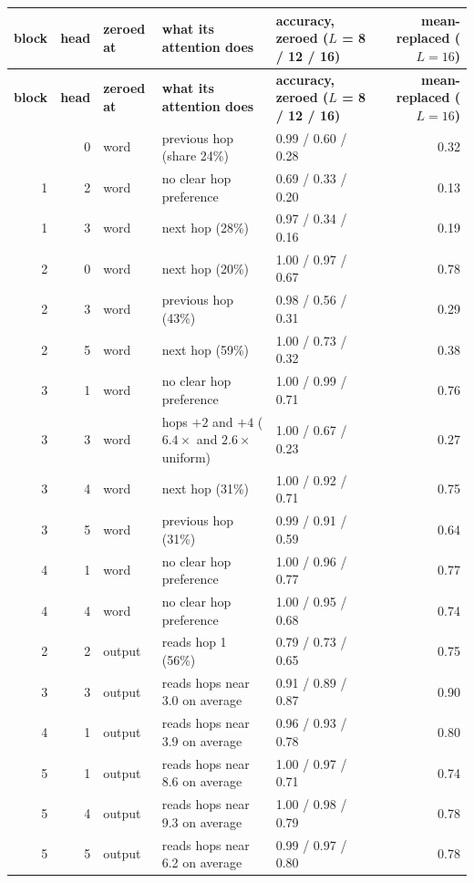 \documentclass[paper=a4,fontsize=11pt,DIV=11,parskip=half,headings=small,numbers=noendperiod]{scrartcl}
\DeclareRobustCommand{\hdr}[1]{\textsf{\bfseries #1}}
\begin{document}
{\footnotesize\nopagebreak[4]
\begin{longtable}{@{}r r l >{\raggedright\arraybackslash}p{4.0cm} l r@{}}
\toprule
\hdr{block} & \hdr{head} & \hdr{zeroed at} & \hdr{what its attention does} & \hdr{accuracy, zeroed ($L$ = 8 / 12 / 16)} & \hdr{mean-replaced ($L=16$)} \\
\midrule
\endfirsthead
\toprule
\hdr{block} & \hdr{head} & \hdr{zeroed at} & \hdr{what its attention does} & \hdr{accuracy, zeroed ($L$ = 8 / 12 / 16)} & \hdr{mean-replaced ($L=16$)} \\
\midrule
\endhead
\bottomrule
\endlastfoot
1 & 0 & word & previous hop (share 24\%) & 0.99 / 0.60 / 0.28 & 0.32 \\
1 & 2 & word & no clear hop preference & 0.69 / 0.33 / 0.20 & 0.13 \\
1 & 3 & word & next hop (28\%) & 0.97 / 0.34 / 0.16 & 0.19 \\
2 & 0 & word & next hop (20\%) & 1.00 / 0.97 / 0.67 & 0.78 \\
2 & 3 & word & previous hop (43\%) & 0.98 / 0.56 / 0.31 & 0.29 \\
2 & 5 & word & next hop (59\%) & 1.00 / 0.73 / 0.32 & 0.38 \\
3 & 1 & word & no clear hop preference & 1.00 / 0.99 / 0.71 & 0.76 \\
3 & 3 & word & hops $+2$ and $+4$ ($6.4\times$ and $2.6\times$ uniform) & 1.00 / 0.67 / 0.23 & 0.27 \\
3 & 4 & word & next hop (31\%) & 1.00 / 0.92 / 0.71 & 0.75 \\
3 & 5 & word & previous hop (31\%) & 0.99 / 0.91 / 0.59 & 0.64 \\
4 & 1 & word & no clear hop preference & 1.00 / 0.96 / 0.77 & 0.77 \\
4 & 4 & word & no clear hop preference & 1.00 / 0.95 / 0.68 & 0.74 \\
2 & 2 & output & reads hop 1 (56\%) & 0.79 / 0.73 / 0.65 & 0.75 \\
3 & 3 & output & reads hops near 3.0 on average & 0.91 / 0.89 / 0.87 & 0.90 \\
4 & 1 & output & reads hops near 3.9 on average & 0.96 / 0.93 / 0.78 & 0.80 \\
5 & 1 & output & reads hops near 8.6 on average & 1.00 / 0.97 / 0.71 & 0.74 \\
5 & 4 & output & reads hops near 9.3 on average & 1.00 / 0.98 / 0.79 & 0.78 \\
5 & 5 & output & reads hops near 6.2 on average & 0.99 / 0.97 / 0.80 & 0.78 \\
\end{longtable}}
\end{document}
